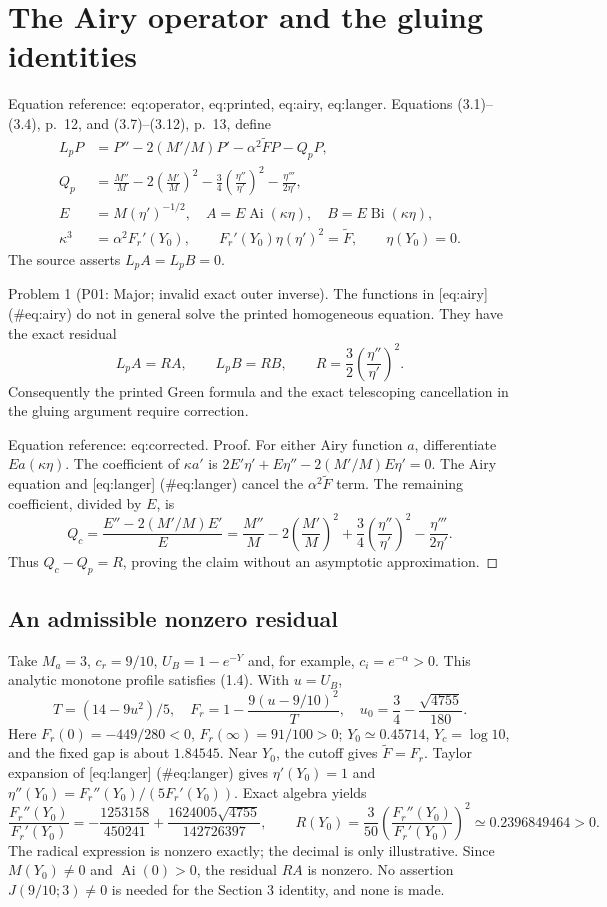 \documentclass[10pt]{article}
\begin{document}
\section*{The Airy operator and the gluing identities}
Equation reference: eq:operator, eq:printed, eq:airy, eq:langer. Equations (3.1)–(3.4), p. 12, and (3.7)–(3.12), p. 13, define \[\begin{aligned}
 L_p P&=P''-2(M'/M)P'-\alpha^2\widetilde F P-Q_pP,
 \\
 Q_p&=\frac{M''}{M}-2\left(\frac{M'}M\right)^2
 -\frac34\left(\frac{\eta''}{\eta'}\right)^2
 -\frac{\eta'''}{2\eta'},\\
 E&=M(\eta')^{-1/2},\quad
 A=E\operatorname{Ai}(\kappa\eta),\quad
 B=E\operatorname{Bi}(\kappa\eta),\\
 \kappa^3&=\alpha^2F_r'(Y_0),\qquad
 F_r'(Y_0)\eta(\eta')^2=\widetilde F,\qquad \eta(Y_0)=0.
 \end{aligned}\] The source asserts \(L_p A=L_p B=0\).\par
Problem 1 (P01: Major; invalid exact outer inverse).  The functions in [eq:airy] (\#eq:airy) do not in general solve the printed homogeneous equation. They have the exact residual \[L_p A=RA,\qquad L_p B=RB,\qquad
 R=\frac32\left(\frac{\eta''}{\eta'}\right)^2.\] Consequently the printed Green formula and the exact telescoping cancellation in the gluing argument require correction.\par
Equation reference: eq:corrected. Proof. For either Airy function \(a\), differentiate \(Ea(\kappa\eta)\). The coefficient of \(\kappa a'\) is \(2E'\eta'+E\eta''-2(M'/M)E\eta'=0\). The Airy equation and [eq:langer] (\#eq:langer) cancel the \(\alpha^2\widetilde F\) term. The remaining coefficient, divided by \(E\), is \[Q_c=\frac{E''-2(M'/M)E'}{E}
 =\frac{M''}{M}-2\left(\frac{M'}M\right)^2
 +\frac34\left(\frac{\eta''}{\eta'}\right)^2
 -\frac{\eta'''}{2\eta'}.
 \] Thus \(Q_c-Q_p=R\), proving the claim without an asymptotic approximation. ◻\par
\subsection*{An admissible nonzero residual}
Take \(M_a=3\), \(c_r=9/10\), \(U_B=1-e^{-Y}\) and, for example, \(c_i=e^{-\alpha}>0\). This analytic monotone profile satisfies (1.4). With \(u=U_B\), \[T=(14-9u^2)/5,\quad
 F_r=1-\frac{9(u-9/10)^2}{T},\quad
 u_0=\frac34-\frac{\sqrt{4755}}{180}.\] Here \(F_r(0)=-449/280<0\), \(F_r(\infty)=91/100>0\); \(Y_0\simeq0.45714\), \(Y_c=\log10\), and the fixed gap is about \(1.84545\). Near \(Y_0\), the cutoff gives \(\widetilde F=F_r\). Taylor expansion of [eq:langer] (\#eq:langer) gives \(\eta'(Y_0)=1\) and \(\eta''(Y_0)=F_r''(Y_0)/(5F_r'(Y_0))\). Exact algebra yields \[\frac{F_r''(Y_0)}{F_r'(Y_0)}
 =-\frac{1253158}{450241}
  +\frac{1624005\sqrt{4755}}{142726397},
 \qquad
 R(Y_0)=\frac3{50}\left(\frac{F_r''(Y_0)}{F_r'(Y_0)}\right)^2
 \simeq0.2396849464>0.\] The radical expression is nonzero exactly; the decimal is only illustrative. Since \(M(Y_0)\ne0\) and \(\operatorname{Ai}(0)>0\), the residual \(RA\) is nonzero. No assertion \(J(9/10;3)\ne0\) is needed for the Section 3 identity, and none is made.\par
\end{document}
